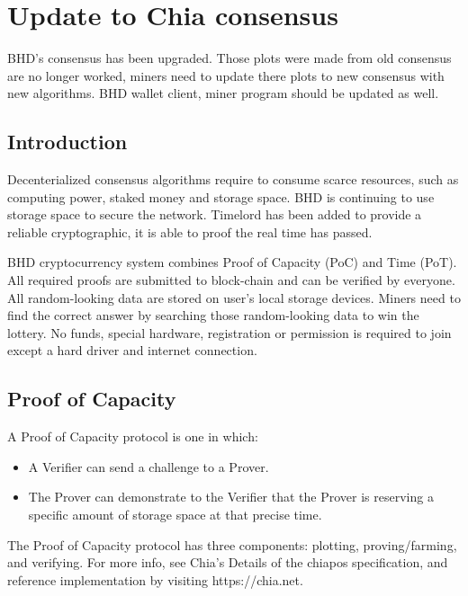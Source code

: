 \chapter{Update to Chia consensus}
\begin{flushleft}
    BHD's consensus has been upgraded. Those plots were made from old consensus are no longer worked, miners need to update there plots to new consensus with new algorithms. BHD wallet client, miner program should be updated as well.
\end{flushleft}
\section{Introduction}
\begin{flushleft}
    Decenterialized consensus algorithms require to consume scarce resources, such as computing power, staked money and storage space. BHD is continuing to use storage space to secure the network. Timelord has been added to provide a reliable cryptographic, it is able to proof the real time has passed.
\end{flushleft}
\begin{flushleft}
    BHD cryptocurrency system combines Proof of Capacity (PoC) and Time (PoT). All required proofs are submitted to block-chain and can be verified by everyone. All random-looking data are stored on user's local storage devices. Miners need to find the correct answer by searching those random-looking data to win the lottery. No funds, special hardware, registration or permission is required to join except a hard driver and internet connection.
\end{flushleft}
\section{Proof of Capacity}
\begin{flushleft}
    A Proof of Capacity protocol is one in which:
\end{flushleft}
\begin{itemize}
    \item A Verifier can send a challenge to a Prover.
    \item The Prover can demonstrate to the Verifier that the Prover is reserving a specific amount of storage space at that precise time.
\end{itemize}
\begin{flushleft}
    The Proof of Capacity protocol has three components: plotting, proving/farming, and verifying. For more info, see Chia's Details of the chiapos specification, and reference implementation by visiting https://chia.net.
\end{flushleft}
